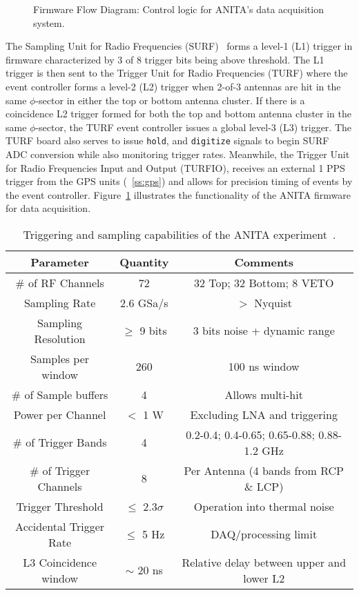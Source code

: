 \begin{figure}[htbp]
\centering
\epsfxsize=4.0in
\caption{Firmware Flow Diagram:  Control logic for ANITA's data acquisition system.}
\label{fig:firmware_block}
\end{figure}

\par The Sampling Unit for Radio Frequencies (SURF)~\cite{SNIC.2006} forms a level-1 (L1) trigger in firmware characterized by 3 of 8 trigger bits being above threshold.  The L1 trigger is then sent to the Trigger Unit for Radio Frequencies (TURF) where the event controller forms a level-2 (L2) trigger when 2-of-3 antennas are hit in the same $\phi$-sector in either the top or bottom antenna cluster.  If there is a coincidence L2 trigger formed for both the top and bottom antenna cluster in the same $\phi$-sector, the TURF event controller issues a global level-3 (L3) trigger.  The TURF board also serves to issue \texttt{hold}, and \texttt{digitize} signals to begin SURF ADC conversion while also monitoring trigger rates.  Meanwhile, the Trigger Unit for Radio Frequencies Input and Output (TURFIO), receives an external 1 PPS trigger from the GPS units (~\ref{ss:gps}) and allows for precision timing of events by the event controller.  Figure~\ref{fig:firmware_block} illustrates the functionality of the ANITA firmware for data acquisition.

\begin{center}
\begin{table}
\caption{Triggering and sampling capabilities of the ANITA experiment~\cite{SNIC.2006}.}
\begin{tabular}{| c | c | c |} \hline
Parameter & Quantity & Comments \\
\hline \hline
\# of RF Channels & 72 & 32 Top; 32 Bottom; 8 VETO \\
Sampling Rate & 2.6 GSa/s & $>$ Nyquist \\
Sampling Resolution & $\geq$ 9 bits & 3 bits noise + dynamic range \\
Samples per window & 260 & 100 ns window \\
\# of Sample buffers & 4 & Allows multi-hit \\
Power per Channel & $<$ 1 W & Excluding LNA and triggering \\
\hline
\# of Trigger Bands & 4 & 0.2-0.4; 0.4-0.65; 0.65-0.88; 0.88-1.2 GHz \\
\# of Trigger Channels & 8 & Per Antenna (4 bands from RCP \& LCP) \\
Trigger Threshold & $\leq$ 2.3$\sigma$ & Operation into thermal noise \\
Accidental Trigger Rate & $\leq$ 5 Hz & DAQ/processing limit \\
L3 Coincidence window & $\sim$ 20 ns & Relative delay between upper and lower L2 \\
\hline
\end{tabular}
\label{tab:digitizer}
\end{table}
\end{center}

